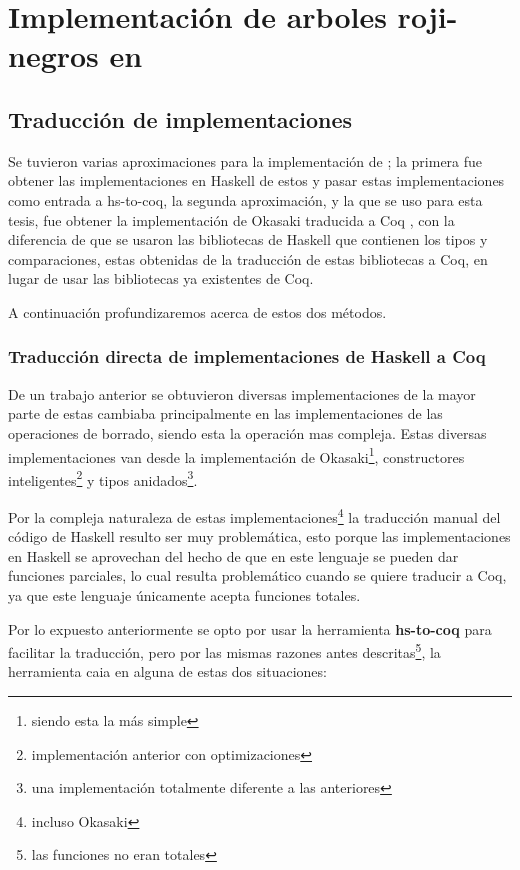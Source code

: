 \chapter{Implementación de arboles roji-negros en {\coq}}

\section{Traducción de implementaciones}
Se tuvieron varias aproximaciones para la implementación de {\arns}; la primera fue obtener las
implementaciones en Haskell de estos\cite{tesisG} y pasar estas implementaciones como entrada a
hs-to-coq, la segunda aproximación, y la que se uso para esta tesis, fue obtener la implementación
de Okasaki traducida a Coq  \cite{MSetRBT}, con la diferencia de que se usaron las bibliotecas de
Haskell que contienen los tipos y comparaciones, estas obtenidas de la traducción de estas
bibliotecas a Coq, en lugar de usar las bibliotecas ya existentes de Coq.

A continuación profundizaremos acerca de estos dos métodos.

\subsection{Traducción directa de implementaciones de Haskell a Coq}
De un trabajo anterior\cite{tesisG} se obtuvieron diversas implementaciones de {\arns} la mayor
parte de estas cambiaba principalmente en las implementaciones de las operaciones de borrado,
siendo esta la operación mas compleja.
Estas diversas implementaciones van desde la implementación de Okasaki\footnote{siendo esta la
m\'as simple}, constructores inteligentes\footnote{implementaci\'on anterior con optimizaciones} y
tipos anidados\footnote{una implementaci\'on totalmente diferente a las anteriores}.

Por la compleja naturaleza de estas implementaciones\footnote{incluso Okasaki} la traducción
manual del código de Haskell resulto ser muy problemática, esto porque las implementaciones en
Haskell se aprovechan del hecho de que en este lenguaje se pueden dar funciones parciales, lo cual
resulta problemático cuando se quiere traducir a Coq, ya que este lenguaje únicamente acepta
funciones totales.

Por lo expuesto anteriormente se opto por usar la herramienta \textbf{hs-to-coq} para facilitar la
traducci\'on, pero por las mismas razones antes descritas\footnote{las funciones no eran totales},
la herramienta caia en alguna de estas dos situaciones:

